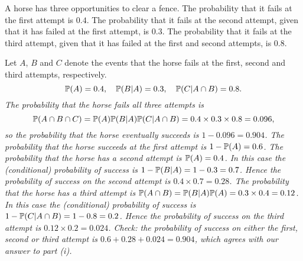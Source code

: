 \begin{exercise}
\begin{questions}
\question
A horse has three opportunities to clear a fence. The probability that it fails at the first attempt is $0.4$. The probability that it fails at the second attempt, given that it has failed at the first attempt, is $0.3$. The probability that it fails at the third attempt, given that it has failed at the first and second attempts, is $0.8$.

\begin{answer}
Let $A$, $B$ and $C$ denote the events that the horse fails at the first, second and third attempts, respectively.
\[
\mathbb{P}(A)=0.4,\quad \mathbb{P}(B|A)=0.3,\quad \mathbb{P}(C|A\cap B)=0.8.
\]
\ben
\it
The probability that the horse fails all three attempts is
\[
\mathbb{P}(A\cap B\cap C) = \mathbb{P}(A)\mathbb{P}(B|A)\mathbb{P}(C|A\cap B) = 0.4\times 0.3\times 0.8 = 0.096,
\]
so the probability that the horse eventually succeeds is $1 - 0.096 = 0.904$.
\it
\bit
\it 
The probability that the horse succeeds at the first attempt is $1-\mathbb{P}(A) = 0.6$.
\it
The probability that the horse has a second attempt is $\mathbb{P}(A)=0.4$. In this case the (conditional) probability of success is $1-\mathbb{P}(B|A) = 1-0.3 = 0.7$. Hence the probability of success on the second attempt is $0.4\times 0.7 = 0.28$.
\it 
The probability that the horse has a third attempt is $\mathbb{P}(A\cap B) = \mathbb{P}(B|A)\mathbb{P}(A) = 0.3\times 0.4 = 0.12$. In this case the (conditional) probability of success is $1-\mathbb{P}(C|A\cap B)= 1-0.8 = 0.2$. Hence the probability of success on the third attempt is $0.12\times 0.2 = 0.024$.
\eit
Check: the probability of success on either the first, second or third attempt is $0.6 + 0.28 + 0.024 = 0.904$, which agrees with our answer to part (i).
\een
\end{answer}

\end{questions}
\end{exercise}

\endinput
